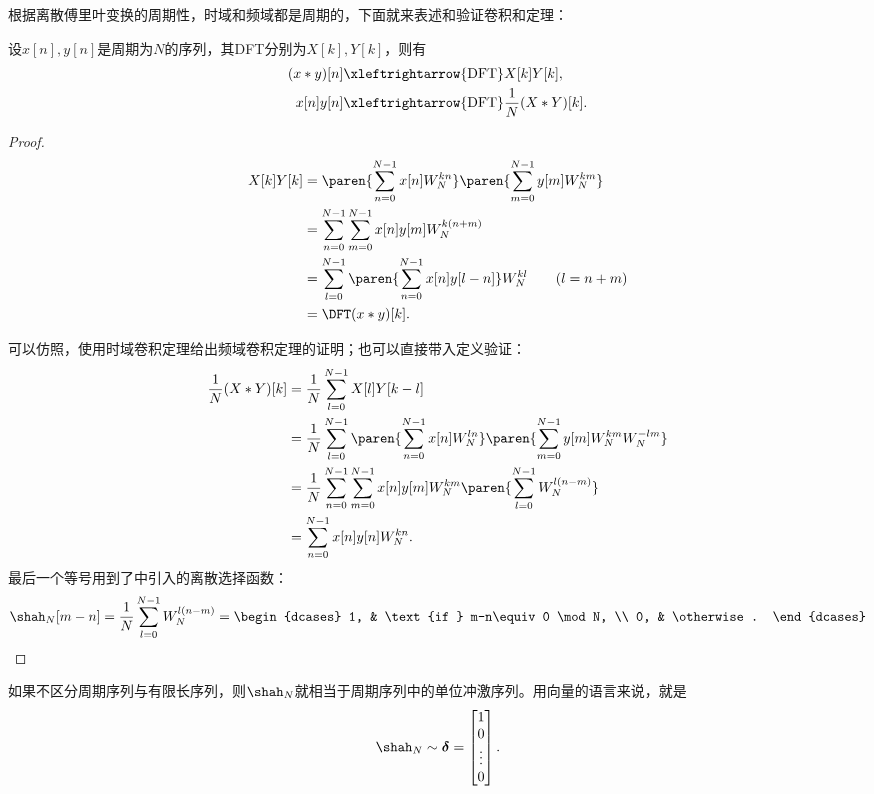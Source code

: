 根据离散傅里叶变换的周期性，时域和频域都是周期的，下面就来表述和验证卷积和定理：
\begin{theorem}[离散傅里叶变换的卷积和定理]\label{thm:DFT_conv}
    设$x[n],y[n]$是周期为$N$的序列，其DFT分别为$X[k],Y[k]$，则有
    \begin{align}
        (x*y)[n]&\xleftrightarrow{\mathrm{DFT}}X[k]Y[k], \\
        x[n]y[n]&\xleftrightarrow{\mathrm{DFT}}\frac{1}{N}(X * Y)[k].
    \end{align}
\end{theorem}
\begin{proof}
    \begin{align}
        X[k]Y[k]&=\paren{\sum_{n=0}^{N-1}x[n]W_N^{kn}}\paren{\sum_{m=0}^{N-1}y[m]W_N^{km}} \nonumber \\
        &=\sum_{n=0}^{N-1}\sum_{m=0}^{N-1}x[n]y[m]W_N^{k(n+m)} \nonumber \\
        &=\sum_{l=0}^{N-1}\paren{\sum_{n=0}^{N-1}x[n]y[l-n]}W_N^{kl} \qquad (l=n+m) \nonumber \\
        &=\DFT(x*y)[k].
    \end{align}

    可以仿照，使用时域卷积定理给出频域卷积定理的证明；也可以直接带入定义验证：
    \begin{align}
        \frac{1}{N}(X * Y)[k]&=\frac{1}{N}\sum_{l=0}^{N-1}X[l]Y[k-l] \nonumber \\
        &=\frac{1}{N}\sum_{l=0}^{N-1}\paren{\sum_{n=0}^{N-1}x[n]W_N^{ln}}\paren{\sum_{m=0}^{N-1}y[m]W_N^{k m}W_N^{-lm}} \nonumber \\
        &=\frac{1}{N}\sum_{n=0}^{N-1}\sum_{m=0}^{N-1}x[n]y[m]W_N^{k m}\paren{\sum_{l=0}^{N-1}W_N^{l(n-m)}} \nonumber \\
        &=\sum_{n=0}^{N-1}x[n]y[n]W_N^{k n}.
    \end{align}
    最后一个等号用到了中引入的离散选择函数：
    \begin{equation}
        \shah_N[m-n]=\frac{1}{N}\sum_{l=0}^{N-1}W_N^{l(n-m)}=\begin{dcases}
            1, & \text{if } m-n\equiv 0 \mod N, \\
            0, & \otherwise.
        \end{dcases}
    \end{equation}
\end{proof}

如果不区分周期序列与有限长序列，则$\shah_N$就相当于周期序列中的单位冲激序列。用向量的语言来说，就是
\begin{equation}
    \shah_N\sim\boldsymbol{\delta}=\begin{bmatrix}
        1      \\
        0      \\
        \vdots \\
        0
    \end{bmatrix}.
\end{equation}

